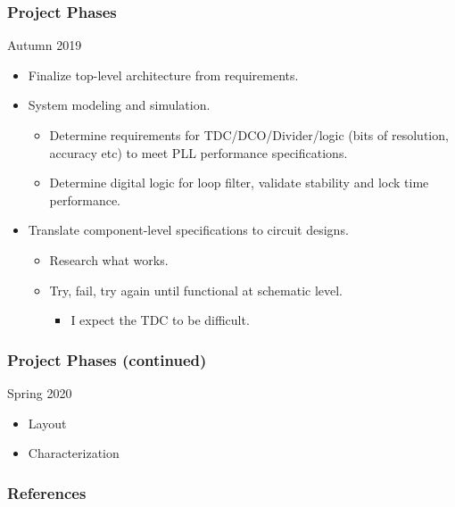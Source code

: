 \documentclass[t, screen, aspectratio=43]{beamer}
\begin{document}
\begin{frame}
  \frametitle{Project Phases}
  \begin{block}{Autumn 2019}
    \footnotesize
    \begin{itemize}
      \item Finalize top-level architecture from requirements.
      \item System modeling and simulation.
      \begin{itemize}
        \footnotesize
        \item Determine requirements for TDC/DCO/Divider/logic (bits of resolution, accuracy etc) to meet PLL performance specifications.
        \item Determine digital logic for loop filter, validate stability and lock time performance.
      \end{itemize}
      \item Translate component-level specifications to circuit designs.
      \begin{itemize}
        \footnotesize
        \item Research what works.
        \item Try, fail, try again until functional at schematic level.
        \begin{itemize}
          \footnotesize
          \item I expect the TDC to be difficult.
      \end{itemize}
      \end{itemize}      
    \end{itemize}
  \end{block}
\end{frame}



\begin{frame}
  \frametitle{Project Phases (continued)}
  \begin{block}{Spring 2020}
    \begin{itemize}
      \footnotesize
      \item Layout
      \item Characterization
    \end{itemize}
  \end{block}
\end{frame}


\begin{frame}
  \frametitle{References}
  \printbibliography
\end{frame}
\end{document}
